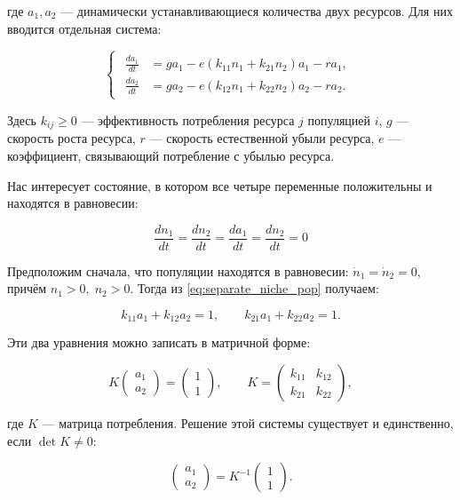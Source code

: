 \documentclass[a4paper, 14pt]{extarticle}
\begin{document}
где $a_1,a_2$ — динамически устанавливающиеся количества двух ресурсов.
Для них вводится отдельная система:

\begin{equation}
\begin{cases}
\begin{aligned}
\frac{da_1}{dt} &= g a_1 - e(k_{11}n_1 + k_{21}n_2)a_1 - r a_1, \\
\frac{da_2}{dt} &= g a_2 - e(k_{12}n_1 + k_{22}n_2)a_2 - r a_2.
\end{aligned}
\end{cases}
\label{eq:separate_niche_res}
\end{equation}

Здесь $k_{ij} \ge 0$ — эффективность потребления ресурса $j$ популяцией $i$,
$g$ — скорость роста ресурса, $r$ — скорость естественной убыли ресурса,
$e$ — коэффициент, связывающий потребление с убылью ресурса.

Нас интересует состояние, в котором все четыре переменные положительны и находятся в равновесии:

\[
\dfrac{dn_1}{dt} = \dfrac{dn_2}{dt}  = \dfrac{da_1}{dt}  = \dfrac{dn_2}{dt} = 0
\]

Предположим сначала, что популяции находятся в равновесии: $\dot n_1 = \dot n_2 = 0$, причём $n_1 > 0,\; n_2 > 0$. Тогда из \eqref{eq:separate_niche_pop} получаем:

\[
k_{11}a_1 + k_{12}a_2 = 1, \qquad
k_{21}a_1 + k_{22}a_2 = 1.
\]

Эти два уравнения можно записать в матричной форме:

\begin{equation}
K \begin{pmatrix} a_1 \\ a_2 \end{pmatrix} = \begin{pmatrix} 1 \\ 1 \end{pmatrix}, \qquad 
K = \begin{pmatrix} k_{11} & k_{12} \\ k_{21} & k_{22} \end{pmatrix},
\label{eq:K_matrix}
\end{equation} 

где $K$ — матрица потребления. Решение этой системы существует и единственно,
если $\det K \ne 0$:

\[
\begin{pmatrix} a_1 \\ a_2 \end{pmatrix} = K^{-1} \begin{pmatrix} 1 \\ 1 \end{pmatrix}.
\]
\end{document}
